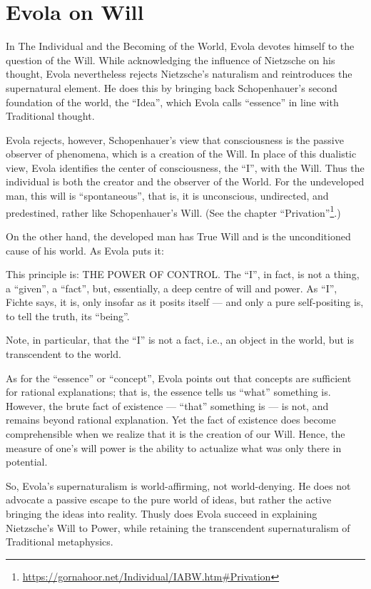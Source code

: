 \section{Evola on Will}

In The Individual and the Becoming of the World, Evola devotes himself to the question of the Will. While acknowledging the influence of Nietzsche on his thought, Evola nevertheless rejects Nietzsche's naturalism and reintroduces the supernatural element. He does this by bringing back Schopenhauer's second foundation of the world, the ``Idea'', which Evola calls ``essence'' in line with Traditional thought.

Evola rejects, however, Schopenhauer's view that consciousness is the passive observer of phenomena, which is a creation of the Will. In place of this dualistic view, Evola identifies the center of consciousness, the ``I'', with the Will. Thus the individual is both the creator and the observer of the World. For the undeveloped man, this will is ``spontaneous'', that is, it is unconscious, undirected, and predestined, rather like Schopenhauer's Will. (See the chapter ``Privation''\footnote{\url{https://gornahoor.net/Individual/IABW.htm\#Privation}}.)

On the other hand, the developed man has True Will and is the unconditioned cause of his world. As Evola puts it:

\begin{quotex}
This principle is: THE POWER OF CONTROL. The ``I'', in fact, is not a thing, a ``given'', a ``fact'', but, essentially, a deep centre of will and power. As ``I'', Fichte says, it is, only insofar as it posits itself --- and only a pure self-positing is, to tell the truth, its ``being''.
\end{quotex}


Note, in particular, that the ``I'' is not a fact, i.e., an object in the world, but is transcendent to the world.

As for the ``essence'' or ``concept'', Evola points out that concepts are sufficient for rational explanations; that is, the essence tells us ``what'' something is. However, the brute fact of existence --- ``that'' something is --- is not, and remains beyond rational explanation. Yet the fact of existence does become comprehensible when we realize that it is the creation of our Will. Hence, the measure of one's will power is the ability to actualize what was only there in potential.

So, Evola's supernaturalism is world-affirming, not world-denying. He does not advocate a passive escape to the pure world of ideas, but rather the active bringing the ideas into reality. Thusly does Evola succeed in explaining Nietzsche's Will to Power, while retaining the transcendent supernaturalism of Traditional metaphysics.



